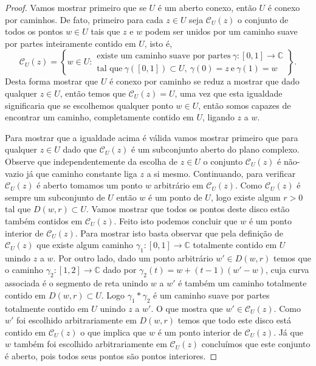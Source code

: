 \begin{proof}
Vamos mostrar primeiro que se $U$ é um aberto conexo, então $U$ é conexo por caminhos. 
De fato, primeiro para cada $z\in U$ seja $\mathscr{C}_{U}(z)$ o conjunto de todos os pontos
$w\in U$ tais que $z$ e $w$ podem ser unidos por um caminho suave por partes inteiramente 
contido em $U$, isto é, 
\[
\mathscr{C}_{U}(z) = 
\left\{
w\in U: 
\begin{array}{l}
\text{existe um caminho suave por partes}\ \gamma:[0,1]\to\mathbb{C}\\
\text{tal que}\ \gamma([0,1])\subset U,\  \gamma(0)=z\ \text{e}\ \gamma(1)=w
\end{array}
\right\}.
\] 
Desta forma mostrar que $U$ é conexo por caminho se reduz a mostrar que 
dado qualquer $z\in U$, então temos que $\mathscr{C}_{U}(z)=U$, uma vez que esta 
igualdade significaria que se escolhemos qualquer ponto $w\in U$, então somos capazes 
de encontrar um caminho, completamente contido em $U$, ligando $z$ a $w$. 

Para mostrar que a igualdade acima é válida vamos mostrar primeiro que 
para qualquer $z\in U$ dado que $\mathscr{C}_{U}(z)$ é um subconjunto aberto do plano complexo.
Observe que independentemente da escolha de $z\in U$ o conjunto $\mathscr{C}_{U}(z)$ é não-vazio
já que caminho constante liga $z$ a si mesmo. Continuando, para verificar 
$\mathscr{C}_{U}(z)$ é aberto tomamos um ponto $w$ arbitrário em $\mathscr{C}_{U}(z)$.
Como $\mathscr{C}_{U}(z)$ é sempre um subconjunto de $U$ então $w$ é um ponto de $U$, logo
existe algum $r>0$ tal que $D(w,r)\subset U$. Vamos mostrar que todos os 
pontos deste disco estão também contidos em $\mathscr{C}_{U}(z)$. 
Feito isto podemos concluir que $w$ é um ponto interior de $\mathscr{C}_{U}(z)$. 
Para mostrar isto basta observar que pela definição de 
$\mathscr{C}_{U}(z)$ que existe algum caminho $\gamma_1:[0,1]\to\mathbb{C}$ totalmente contido em $U$
unindo $z$ a $w$. Por outro lado, dado um ponto arbitrário $w' \in D(w,r)$ 
temos que o caminho $\gamma_2:[1,2]\to\mathbb{C}$ dado por $\gamma_2(t)=w+(t-1)(w'-w)$,
cuja curva associada é o segmento de reta unindo $w$ a $w'$ 
é também um caminho totalmente contido em $D(w,r)\subset U$.
Logo $\gamma_1*\gamma_2$ é um caminho suave por partes totalmente contido em $U$ unindo $z$ a $w'$.
O que mostra que $w'\in \mathscr{C}_{U}(z)$. Como $w'$ foi escolhido arbitrariamente 
em $D(w,r)$ temos que todo este disco está contido em $\mathscr{C}_{U}(z)$ o que implica que $w$
é um ponto interior de $\mathscr{C}_{U}(z)$. Já que $w$ também foi escolhido arbitrariamente em 
$\mathscr{C}_{U}(z)$ concluímos que este conjunto é aberto, pois todos seus pontos são pontos 
interiores.


\end{proof}
